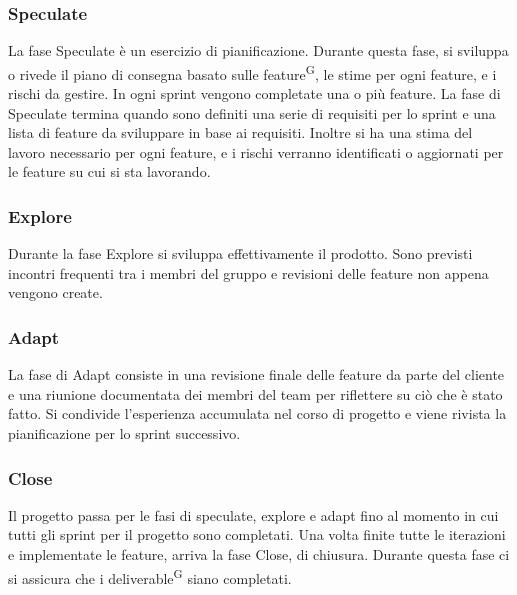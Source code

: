     \subsubsection{Speculate}\label{sec:modello_sviluppo:agile:speculate}
    La fase Speculate è un esercizio di pianificazione. Durante questa fase, si sviluppa o rivede il piano di consegna basato sulle feature\textsuperscript{G}, le stime per ogni feature, e i rischi da gestire. In ogni sprint vengono completate una o più feature. %
    La fase di Speculate termina quando sono definiti una serie di requisiti per lo sprint e una lista di feature da sviluppare in base ai requisiti. Inoltre si ha una stima del lavoro necessario per ogni feature, e i rischi verranno identificati o aggiornati per le feature su cui si sta lavorando.
    \subsubsection{Explore}\label{sec:modello_sviluppo:agile:explore}
    Durante la fase Explore si sviluppa effettivamente il prodotto. Sono previsti incontri frequenti tra i membri del gruppo e revisioni delle feature non appena vengono create.
    \subsubsection{Adapt}\label{sec:modello_sviluppo:agile:adapt}
    La fase di Adapt consiste in una revisione finale delle feature da parte del cliente e una riunione documentata dei membri del team per riflettere su ciò che è stato fatto. Si condivide l'esperienza accumulata nel corso di progetto e viene rivista la pianificazione per lo sprint successivo.
    \subsubsection{Close}\label{sec:modello_sviluppo:agile:close}
    Il progetto passa per le fasi di speculate, explore e adapt fino al momento in cui tutti gli sprint per il progetto sono completati. Una volta finite tutte le iterazioni e implementate le feature, arriva la fase Close, di chiusura.
    Durante questa fase ci si assicura che i deliverable\textsuperscript{G} siano completati.

